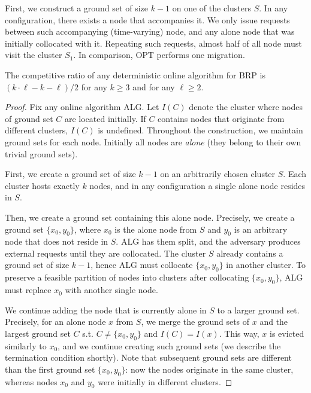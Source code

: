 \documentclass[manuscript,screen=true, review, anonymous]{acmart}
\newcommand{\OPT}{\textsf{OPT}\xspace}
\newcommand{\ALG}{\textsf{ALG}\xspace}
\newcommand{\OBRP}{BRP}
\begin{document}
First, we construct a ground set of size $k-1$ on one of the clusters $S$.
In any configuration, there exists a node that accompanies it.
We only issue requests between such accompanying (time-varying) node, and any alone node that was initially collocated with it.
Repeating such requests, almost half of all node must visit the cluster $S_1$.
In comparison, \OPT performs one migration.

\begin{theorem}
	\label{th:lowerbound}
	The competitive ratio of any deterministic online algorithm for \OBRP{} is  $(k\cdot \ell - k - \ell)/2$ for any $k\geq 3$ and for any $\ell \geq 2$.
\end{theorem}

\begin{proof}
	Fix any online algorithm \ALG{}.
	Let $I(C)$ denote the cluster where nodes of ground set $C$ are located initially.
	If $C$ contains nodes that originate from different clusters, $I(C)$ is undefined.
	Throughout the construction, we maintain ground sets for each node.
	Initially all nodes are \emph{alone} (they belong to their own trivial ground sets).

	First, we create a ground set of size $k-1$ on an arbitrarily chosen cluster $S$.
	Each cluster hosts exactly $k$ nodes, and in any configuration a single alone node resides in $S$.

	Then, we create a ground set containing this alone node.
	Precisely,
	we create a ground set $\{x_0, y_0\}$, 
	where $x_0$ is the alone node from $S$ and $y_0$ is an arbitrary node that does not reside in $S$.
	\ALG has them split, and the adversary produces external requests until they are collocated.
	The cluster $S$ already contains a ground set of size $k-1$, hence \ALG must collocate $\{x_0, y_0\}$ in another cluster.
	To preserve a feasible partition of nodes into clusters after collocating $\{x_0, y_0\}$,
	\ALG must replace $x_0$ with another single node.
	

	We continue adding the node that is currently alone in $S$ to a larger ground set.
	Precisely, for an alone node $x$ from $S$, we merge the ground sets of $x$ and the largest ground set $C$ s.t. $C \neq \{x_0,y_0\}$ and $I(C) = I(x)$.
	This way, $x$ is evicted similarly to $x_0$, and we continue creating such ground sets (we describe the termination condition shortly).
	Note that subsequent ground sets are different than the first ground set $\{x_0, y_0\}$: now the nodes originate in the same cluster, whereas nodes $x_0$ and $y_0$ were initially in different clusters.


\end{proof}
\end{document}
